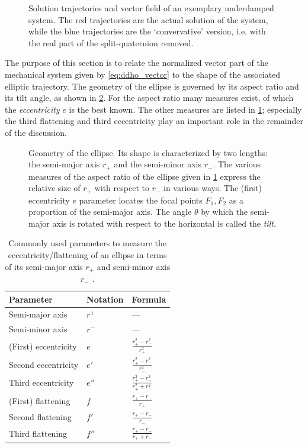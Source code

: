 \begin{figure}[ht!]
    \centering
    
    \caption{Solution trajectories and vector field of an exemplary underdamped system. The red trajectories are the actual solution of the system, while the blue trajectories are the `convervative' version, i.e. with the real part of the split-quaternion removed.}
    \label{fig:underdamped}
\end{figure}

The purpose of this section is to relate the normalized vector part of the mechanical system given by \cref{eq:ddho_vector} to the shape of the associated elliptic trajectory. The geometry of the ellipse is governed by its aspect ratio and its tilt angle, as shown in \cref{fig:ellipse}. For the aspect ratio many measures exist, of which the \emph{eccentricity} $e$ is the best known. The other measures are listed in \cref{tab:ellipse}; especially the third flattening and third eccentricity play an important role in the remainder of the discussion.

\begin{figure}[ht]
    \centering
    
    \caption{Geometry of the ellipse. Its shape is characterized by two lengths: the semi-major axis $r_+$ and the semi-minor axis $r_-$. The various measures of the aspect ratio of the ellipse given in \cref{tab:ellipse} express the relative size of $r_+$ with respect to $r_-$ in various ways. The (first) eccentricity $e$ parameter locates the focal points $F_1, F_2$ as a proportion of the semi-major axis. The angle $\theta$ by which the semi-major axis is rotated with respect to the horizontal is called the \emph{tilt}.}
    \label{fig:ellipse}
\end{figure}

\renewcommand{\arraystretch}{1.4}
\begin{table}[ht]
    \centering
    \caption{Commonly used parameters to measure the eccentricity/flattening of an ellipse in terms of its semi-major axis $r_+$ and semi-minor axis $r_-$ \cite{Rapp1991}.}
    \label{tab:ellipse}
    \begin{tabular}{lll}
    \toprule
        \textbf{Parameter} & \textbf{Notation} & \textbf{Formula} \\
    \midrule
        Semi-major axis & $r^+$ & --- \\ 
        Semi-minor axis & $r^-$ & --- \\
    \midrule
        (First) eccentricity & $e$ & $\frac{r_+^2 - r_-^2}{r_+^2}$ \\
        Second eccentricity & $e'$ & $\frac{r_+^2 - r_-^2}{r_-^2}$ \\
        Third eccentricity & $e''$ & $\frac{r_+^2 - r_-^2}{r_+^2 + r_-^2}$ \\
    \midrule
        (First) flattening & $f$ & $\frac{r_+ - r_-}{r_+}$ \\
        Second flattening & $f'$ & $\frac{r_+ - r_-}{r_-}$ \\
        Third flattening & $f''$ & $\frac{r_+ - r_-}{r_+ + r_-}$ \\
    \bottomrule
    \end{tabular}
\end{table}
\renewcommand{\arraystretch}{1}

